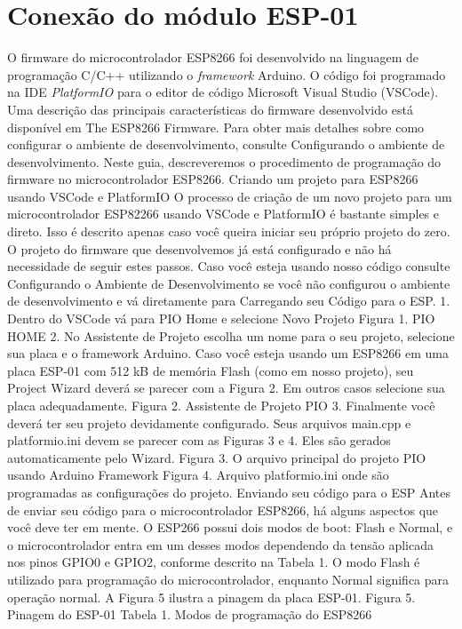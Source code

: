 \chapter{Conexão do módulo ESP-01}\label{apendix: programming-esp01}

O firmware do microcontrolador ESP8266 foi desenvolvido na linguagem de programação C/C++ utilizando o \textit{framework} Arduino. O código foi programado na IDE \textit{PlatformIO} para o editor de código Microsoft Visual Studio (VSCode). Uma descrição das principais características do firmware desenvolvido está disponível em The ESP8266 Firmware. Para obter mais detalhes sobre como configurar o ambiente de desenvolvimento, consulte Configurando o ambiente de desenvolvimento. Neste guia, descreveremos o procedimento de programação do firmware no microcontrolador ESP8266.
Criando um projeto para ESP8266 usando VSCode e PlatformIO
O processo de criação de um novo projeto para um microcontrolador ESP82266 usando VSCode e PlatformIO é bastante simples e direto. Isso é descrito apenas caso você queira iniciar seu próprio projeto do zero. O projeto do firmware que desenvolvemos já está configurado e não há necessidade de seguir estes passos. Caso você esteja usando nosso código consulte Configurando o Ambiente de Desenvolvimento se você não configurou o ambiente de desenvolvimento e vá diretamente para Carregando seu Código para o ESP.
1. Dentro do VSCode vá para PIO Home e selecione Novo Projeto
Figura 1. PIO HOME
2. No Assistente de Projeto escolha um nome para o seu projeto, selecione sua placa e o framework Arduino. Caso você esteja usando um ESP8266 em uma placa ESP-01 com 512 kB de memória Flash (como em nosso projeto), seu Project Wizard deverá se parecer com a Figura 2. Em outros casos selecione sua placa adequadamente.
Figura 2. Assistente de Projeto PIO
3. Finalmente você deverá ter seu projeto devidamente configurado. Seus arquivos main.cpp e platformio.ini devem se parecer com as Figuras 3 e 4. Eles são gerados automaticamente pelo Wizard.
Figura 3. O arquivo principal do projeto PIO usando Arduino Framework
Figura 4. Arquivo platformio.ini onde são programadas as configurações do projeto.
Enviando seu código para o ESP
Antes de enviar seu código para o microcontrolador ESP8266, há alguns aspectos que você deve ter em mente. O ESP266 possui dois modos de boot: Flash e Normal, e o microcontrolador entra em um desses modos dependendo da tensão aplicada nos pinos GPIO0 e GPIO2, conforme descrito na Tabela 1. O modo Flash é utilizado para programação do microcontrolador, enquanto Normal significa para operação normal. A Figura 5 ilustra a pinagem da placa ESP-01.
Figura 5. Pinagem do ESP-01
Tabela 1. Modos de programação do ESP8266

